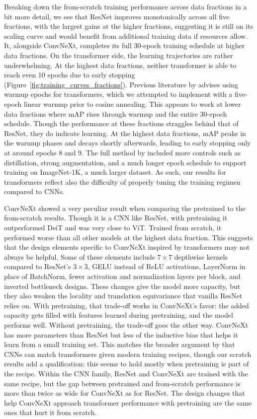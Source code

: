 \documentclass{article}
\begin{document}
Breaking down the from-scratch training performance across data
fractions in a bit more detail, we see that ResNet improves
monotonically across all five fractions, with the largest gains at the
higher fractions, suggesting it is still on its scaling curve and would
benefit from additional training data if resources allow. It, alongside
ConvNeXt, completes its full 30-epoch training schedule at higher data
fractions. On the transformer side, the learning trajectories are
rather underwhelming. At the highest data fractions, neither
transformer is able to reach even 10 epochs due to early stopping
(Figure~\ref{fig:training_curves_fractions}).
Previous literature by \citet{touvron2021} advises using warmup epochs
for transformers, which we attempted to implement with a five-epoch
linear warmup prior to cosine annealing. This appears to work at lower
data fractions where mAP rises through warmup and the entire 30-epoch
schedule. Though the performance at these fractions straggles behind
that of ResNet, they do indicate learning. At the highest data
fractions, mAP peaks in the warmup phases and decays shortly
afterwards, leading to early stopping only at around epochs 8 and 9.
The full method by \citet{touvron2021} included more controls such as
distillation, strong augmentation, and a much longer epoch schedule to
support training on ImageNet-1K, a much larger dataset. As such, our
results for transformers reflect also the difficulty of properly tuning
the training regimen compared to CNNs.

ConvNeXt showed a very peculiar result when comparing the pretrained to
the from-scratch results. Though it is a CNN like ResNet, with
pretraining it outperformed DeiT and was very close to ViT. Trained
from scratch, it performed worse than all other models at the highest
data fraction. This suggests that the design elements specific to
ConvNeXt inspired by transformers may not always be helpful. Some of
these elements include $7 \times 7$ depthwise kernels compared to
ResNet's $3 \times 3$, GELU instead of ReLU activations, LayerNorm in
place of BatchNorm, fewer activation and normalization layers per
block, and inverted bottleneck designs. These changes give the model
more capacity, but they also weaken the locality and translation
equivariance that vanilla ResNet relies on. With
pretraining, that trade-off works in ConvNeXt's favor: the added
capacity gets filled with features learned during pretraining, and the
model performs well. Without pretraining, the trade-off goes the other
way. ConvNeXt has more parameters than ResNet but less of the inductive
bias that helps it learn from a small training set. This matches the
broader argument by \citet{liu2022} that CNNs can match transformers
given modern training recipes, though our scratch results add a
qualification: this seems to hold mostly when pretraining is part of
the recipe. Within the CNN family, ResNet and ConvNeXt are trained with
the same recipe, but the gap between pretrained and from-scratch
performance is more than twice as wide for ConvNeXt as for ResNet. The
design changes that help ConvNeXt approach transformer performance with
pretraining are the same ones that hurt it from scratch.
\end{document}
